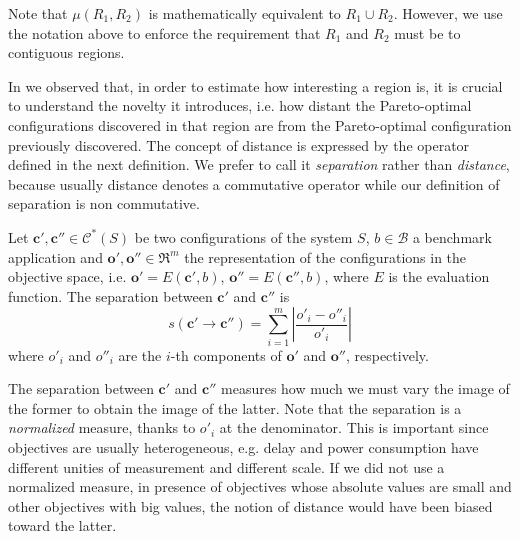 Note that $\mu(R_{1},R_{2})$ is mathematically equivalent to $R_{1}\cup R_{2}$. However, we use the notation above to enforce the requirement that
$R_{1}$ and $R_{2}$ must be to contiguous regions.

In  we observed that, in order to estimate how interesting a region is, it is crucial to understand the novelty it introduces, i.e. how distant the Pareto-optimal configurations discovered in that region are from the Pareto-optimal configuration previously discovered. The concept of distance is expressed by the operator defined in the next definition. We prefer to call it \emph{separation} rather than \emph{distance}, because usually distance denotes a commutative operator while our definition of separation is non commutative.

\begin{definition}[Separation]
Let $\mathbf{c}',\mathbf{c}''\in \mathcal{C}^*(S)$ be two configurations of the system $S$, $b\in\mathcal{B}$ a benchmark application and $\mathbf{o}',\mathbf{o}''\in \Re^m$ the representation of the configurations in the objective space, i.e. $\mathbf{o}'=E \left(\mathbf{c}', b\right)$, $\mathbf{o}''=E \left(\mathbf{c}'', b\right)$, where $E$ is the evaluation function. The separation between
$\mathbf{c}'$ and $\mathbf{c}''$ is 
	\[
	s\left(\mathbf{c}'\rightarrow\mathbf{c}''\right)=\sum_{i=1}^{m}\left|\frac{o'_{i}-o''_{i}}{o'_{i}}\right|
	\]
where $o'_i$ and $o''_i$ are the $i$-th components of $\mathbf{o}'$ and $\mathbf{o}''$, respectively.
\end{definition}

The separation between $\mathbf{c}'$ and $\mathbf{c}''$ measures how
much we must vary the image of the former to obtain the image of the latter. Note that the separation is a \emph{normalized} measure, thanks to $o'_i$ at the denominator. This is important since objectives are usually heterogeneous, e.g. delay and power consumption have different unities of measurement and different scale. If we did not use a normalized measure, in presence of objectives whose absolute values are small and other objectives with big values, the notion of distance would have been biased toward the latter.
